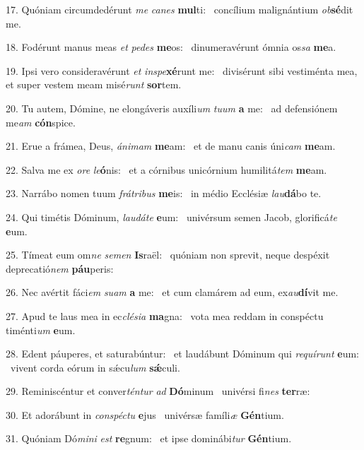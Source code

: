 17. Quóniam circumdedérunt \textit{me} \textit{ca}\textit{nes} \textbf{mul}ti: \ast\  concílium malignántium \textit{ob}\textbf{sé}dit me.\

18. Fodérunt manus meas \textit{et} \textit{pe}\textit{des} \textbf{me}os: \ast\  dinumeravérunt ómnia os\textit{sa} \textbf{me}a.\

19. Ipsi vero consideravérunt \textit{et} \textit{in}\textit{spe}\textbf{xé}runt me: \ast\  divisérunt sibi vestiménta mea, et super vestem meam misé\textit{runt} \textbf{sor}tem.\

20. Tu autem, Dómine, ne elongáveris auxíli\textit{um} \textit{tu}\textit{um} \textbf{a} me: \ast\  ad defensiónem me\textit{am} \textbf{cón}spice.\

21. Erue a frámea, Deus, \textit{á}\textit{ni}\textit{mam} \textbf{me}am: \ast\  et de manu canis úni\textit{cam} \textbf{me}am.\

22. Salva me ex \textit{o}\textit{re} \textit{le}\textbf{ó}nis: \ast\  et a córnibus unicórnium humilitá\textit{tem} \textbf{me}am.\

23. Narrábo nomen tuum \textit{frá}\textit{tri}\textit{bus} \textbf{me}is: \ast\  in médio Ecclésiæ \textit{lau}\textbf{dá}bo te.\

24. Qui timétis Dóminum, \textit{lau}\textit{dá}\textit{te} \textbf{e}um: \ast\  univérsum semen Jacob, glorificá\textit{te} \textbf{e}um.\

25. Tímeat eum om\textit{ne} \textit{se}\textit{men} \textbf{Is}raël: \ast\  quóniam non sprevit, neque despéxit deprecatió\textit{nem} \textbf{páu}peris:\

26. Nec avértit fáci\textit{em} \textit{su}\textit{am} \textbf{a} me: \ast\  et cum clamárem ad eum, ex\textit{au}\textbf{dí}vit me.\

27. Apud te laus mea in ec\textit{clé}\textit{si}\textit{a} \textbf{ma}gna: \ast\  vota mea reddam in conspéctu timénti\textit{um} \textbf{e}um.\

28. Edent páuperes, et saturabúntur: \dag\  et laudábunt Dóminum qui \textit{re}\textit{quí}\textit{runt} \textbf{e}um: \ast\  vivent corda eórum in sǽcu\textit{lum} \textbf{sǽ}culi.\

29. Reminiscéntur et conver\textit{tén}\textit{tur} \textit{ad} \textbf{Dó}minum \ast\  univérsi fi\textit{nes} \textbf{ter}ræ:\

30. Et adorábunt in \textit{con}\textit{spéc}\textit{tu} \textbf{e}jus \ast\  univérsæ famíli\textit{æ} \textbf{Gén}tium.\

31. Quóniam Dó\textit{mi}\textit{ni} \textit{est} \textbf{re}gnum: \ast\  et ipse dominábi\textit{tur} \textbf{Gén}tium.\

